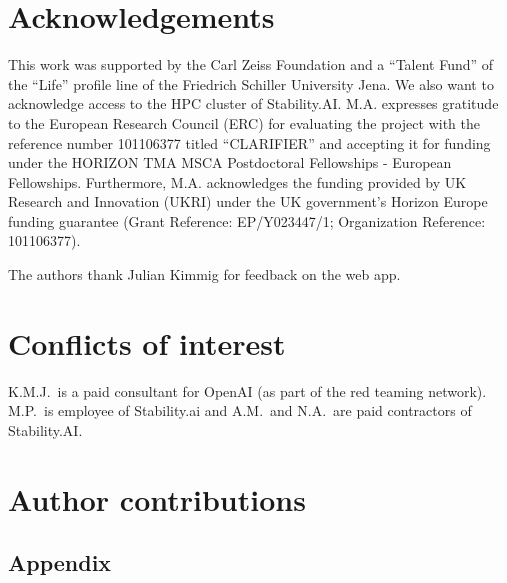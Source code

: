 \documentclass[11pt, oneside]{article}
\begin{document}
\begin{refsection}
\section*{Acknowledgements}
This work was supported by the Carl Zeiss Foundation and a \enquote{Talent Fund} of the \enquote{Life} profile line of the Friedrich Schiller University Jena.
We also want to acknowledge access to the HPC cluster of Stability.AI.
M.A. expresses gratitude to the European Research Council (ERC) for evaluating the project with the reference number 101106377 titled \enquote{CLARIFIER} and accepting it for funding under the HORIZON TMA MSCA Postdoctoral Fellowships - European Fellowships. 
Furthermore, M.A. acknowledges the funding provided by UK Research and Innovation (UKRI) under the UK government’s Horizon Europe funding guarantee (Grant Reference: EP/Y023447/1; Organization Reference: 101106377).

The authors thank Julian Kimmig for feedback on the web app. 

\section*{Conflicts of interest}
K.M.J.\ is a paid consultant for OpenAI (as part of the red teaming network). M.P.\ is employee of Stability.ai and A.M.\ and N.A.\ are paid contractors of Stability.AI.

\section*{Author contributions}

\footnotesize
\insertcredits
\normalsize
\printbibliography
\end{refsection}


\clearpage
\begin{refsection}
\appendix
\section{Appendix}

\clearpage
\printbibliography[heading=subbibintoc]
\end{refsection}
\end{document}
